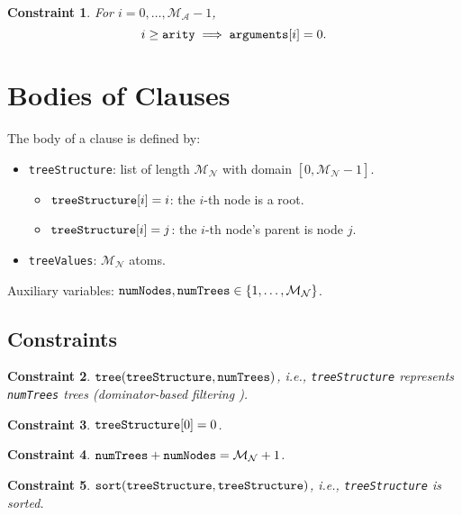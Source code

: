 \documentclass[runningheads]{llncs}
\newtheorem{constraint}{Constraint}
\newcommand{\variable}[1]{\texttt{\textup{#1}}}
\newcommand{\maxArity}{\mathcal{M}_{\mathcal{A}}}
\newcommand{\maxNumNodes}{\mathcal{M}_{\mathcal{N}}}
\begin{document}
\begin{constraint}
  For $i = 0, \dots, \maxArity{} - 1$,
  \[
    i \ge \variable{arity} \implies \variable{arguments}[i] = 0.
  \]
\end{constraint}

\section{Bodies of Clauses}

\begin{definition}
  The body of a clause is defined by:
  \begin{itemize}
  \item \variable{treeStructure}: list of length $\maxNumNodes{}$ with
    domain $[0, \maxNumNodes{} - 1]$.
    \begin{itemize}
    \item $\variable{treeStructure}[i] = i$: the $i$-th node is a root.
    \item $\variable{treeStructure}[i] = j$: the $i$-th node's parent is node $j$.
    \end{itemize}
  \item \variable{treeValues}: $\maxNumNodes{}$ atoms.
  \end{itemize}
\end{definition}

Auxiliary variables: $\variable{numNodes}, \variable{numTrees} \in \{ 1, \dots,
\maxNumNodes{} \}$.

\subsection{Constraints}

\begin{constraint}
  $\variable{tree}(\variable{treeStructure}, \variable{numTrees})$, i.e.,
  \variable{treeStructure} represents \variable{numTrees} trees (dominator-based
  filtering \cite{DBLP:conf/cp/FagesL11}).
\end{constraint}

\begin{constraint}
  $\variable{treeStructure}[0] = 0$.
\end{constraint}

\begin{constraint}
  $\variable{numTrees} + \variable{numNodes} = \maxNumNodes{} + 1$.
\end{constraint}

\begin{constraint}
  $\variable{sort}(\variable{treeStructure}, \variable{treeStructure})$, i.e.,
  \variable{treeStructure} is sorted.
\end{constraint}
\end{document}
